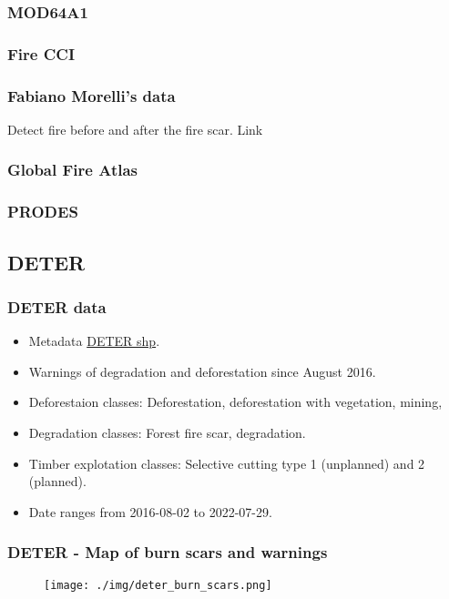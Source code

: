 \documentclass{beamer}
\begin{document}
\begin{frame}
    \frametitle{MOD64A1}
\end{frame}

\begin{frame}
    \frametitle{Fire CCI}
\end{frame}

\begin{frame}
    \frametitle{Fabiano Morelli's data}
    Detect fire before and after the fire scar. 
    Link 
\end{frame}



\begin{frame}
    \frametitle{Global Fire Atlas}
\end{frame}



\begin{frame}
    \frametitle{PRODES}
\end{frame}



\subsection{DETER}



\begin{frame}[fragile]
    \frametitle{DETER data}
    \begin{itemize}
        \item Metadata \href{http://terrabrasilis.dpi.inpe.br/geonetwork/srv/por/catalog.search#/metadata/f2153c4a-915b-48a6-8658-963bdce7366c}{DETER shp}.
        \item Warnings of degradation and deforestation since August 2016.
        \item Deforestaion classes: Deforestation, deforestation with 
            vegetation, mining, 
        \item Degradation classes: Forest fire scar, degradation.
        \item Timber explotation classes: Selective cutting type 1 (unplanned) 
            and 2 (planned).
        \item Date ranges from 2016-08-02 to 2022-07-29.
    \end{itemize}
\end{frame}



\begin{frame}
    \frametitle{DETER - Map of burn scars and warnings}
    \begin{figure}
        \centering
        \texttt{[image: ./img/deter\_burn\_scars.png]}
    \end{figure}
\end{frame}
\end{document}
